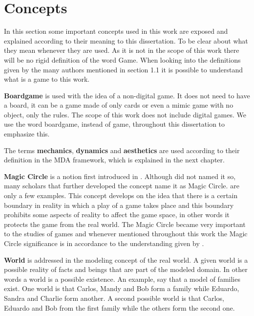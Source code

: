 \section{Concepts}
In this section some important concepts used in this work are exposed and explained according  to their meaning to this dissertation. To be clear about what they mean whenever they are used. As it is not in the scope of this work there will be no rigid definition of the word Game. When looking into the definitions given by the many authors mentioned in section 1.1 it is possible to understand what is a game to this work. 

\textbf{Boardgame} is used with the idea of a non-digital game. It does not need to have a board, it can be a game made of only cards or even a mimic game with no object, only the rules. The scope of this work does not include digital games. We use the word boardgame, instead of game, throughout this dissertation to emphasize this.

The terms \textbf{mechanics}, \textbf{dynamics} and \textbf{aesthetics} are used according to their definition in the MDA framework, which is explained in the next chapter. 

\textbf{Magic Circle} is a notion first introduced in \cite{huizinga2014homo}. Although \citeauthor{huizinga2014homo} did not named it so, many scholars that further developed the concept name it as Magic Circle. \cite{salen2004rules,bateman_implicit_2015} are only a few examples. This concept develops on the idea that there is a certain boundary in reality in which a play of a game takes place and this boundary prohibits some aspects of reality to affect the game space, in other words it protects the game from the real world. The Magic Circle became very important to the studies of games and whenever mentioned throughout this work the Magic Circle significance is in accordance to the understanding given by \cite{salen2004rules}.

\textbf{World} is addressed in the modeling concept of the real world. A given world is a possible reality of facts and beings that are part of the modeled domain. In other words a world is a possible existence. An example, say that a model of families exist. One world is that Carlos, Mandy and Bob form a family while Eduardo, Sandra and Charlie form another. A second possible world is that Carlos, Eduardo and Bob from the first family while the others form the second one. 

